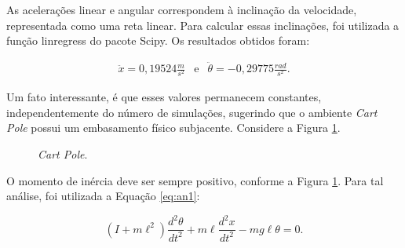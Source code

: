 \documentclass[12pt,           %
a4paper,                       %
openany,                       %
oneside,                       %
chapter=TITLE,                 %
english,                       %
spanish,                       %
brazil,                        %
sumario=tradicional]{abntex2}  %
\begin{document}
\begin{OnehalfSpace}
As acelerações linear e angular correspondem à inclinação da velocidade, representada como uma reta linear. Para calcular essas inclinações, foi utilizada a função linregress do pacote Scipy. Os resultados obtidos foram:

\begin{equation}
    \begin{matrix}
        \ddot{x} = 0,19524\frac{m}{s^2} & \text{e} & \ddot{\theta} =-0,29775\frac{rad}{s^2}.
    \end{matrix}
\label{eq:vlevt}
\end{equation}

Um fato interessante, é que esses valores permanecem constantes, independentemente do número de simulações, sugerindo que o ambiente \textit{Cart Pole} possui um embasamento físico subjacente. Considere a Figura \ref{fig:cartPole}.

\begin{figure}[H]
    \centering
    \vspace*{-0.2cm}
    \caption{\textit{Cart Pole}.}
    \centering 
    \label{fig:cartPole}
\end{figure}
\vspace*{-0.8cm}
{\raggedright {}}

O momento de inércia deve ser sempre positivo, conforme a Figura \ref{fig:cartPole}. Para tal análise, foi utilizada a Equação \ref{eq:an1}:

\begin{equation}
    (I + m\ell^2)\frac{d^2\theta}{dt^2} + m\ell\frac{d^2x}{dt^2} - mg\ell\theta = 0.
    \label{eq:an1}
\end{equation}


\end{OnehalfSpace}
\end{document}
